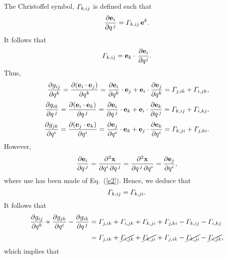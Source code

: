 \documentclass[12pt,prb,aps,notitlepage]{revtex4-1}
\begin{document}
The Christoffel symbol, ${\mit\Gamma}_{k,ij}$ is defined such that 
\begin{equation}\label{e25}
\frac{\partial {\bf e}_i}{\partial q^{\,j}} = {\mit\Gamma}_{k,ij}\,{\bf e}^k.
\end{equation}
It follows that 
\begin{equation}
{\mit\Gamma}_{k,ij} = {\bf e}_k\cdot\,\frac{\partial {\bf e}_i}{\partial q^j}.
\end{equation}
Thus, 
\begin{align}
\frac{\partial g_{ij}}{\partial q^k} = \frac{\partial ({\bf e}_i\cdot{\bf e}_j)}{\partial q^k}= \frac{\partial {\bf e}_i}{\partial q^k}\cdot{\bf e}_j + {\bf e}_i\cdot\frac{\partial {\bf e}_j}{\partial q^k}= {\mit\Gamma}_{j,ik} + {\mit\Gamma}_{i,jk},\\[0.5ex]
\frac{\partial g_{ik}}{\partial q^{\,j}} = \frac{\partial ({\bf e}_i\cdot{\bf e}_k)}{\partial q^{\,j}}= \frac{\partial {\bf e}_i}{\partial q^{\,j}}\cdot{\bf e}_k+ {\bf e}_i\cdot\frac{\partial {\bf e}_k}{\partial q^{\,j}}= {\mit\Gamma}_{k,ij} + {\mit\Gamma}_{i,kj},\\[0.5ex]
\frac{\partial g_{jk}}{\partial q^i} = \frac{\partial ({\bf e}_j\cdot{\bf e}_k)}{\partial q^i}= \frac{\partial {\bf e}_j}{\partial q^i}\cdot{\bf e}_k+ {\bf e}_j\cdot\frac{\partial {\bf e}_k}{\partial q^i}= {\mit\Gamma}_{k,ji} + {\mit\Gamma}_{j,ki}.
\end{align}
However,
\begin{equation}
\frac{\partial{\bf e}_i}{\partial q^{\,j}} = \frac{\partial^2{\bf x}}{\partial q^i\,\partial q^{\,j}}= \frac{\partial^2{\bf x}}{\partial q^{\,j}\,\partial q^{i}}
= \frac{\partial{\bf e}_j}{\partial q^i},
\end{equation}
where use has been made of Eq.~(\ref{e2}). Hence, we deduce that
\begin{equation}
{\mit\Gamma}_{k,ij}= {\mit\Gamma}_{k,ji}.
\end{equation}
It follows that
\begin{align}
\frac{\partial g_{ij}}{\partial q^k} + \frac{\partial g_{jk}}{\partial q^i} -\frac{\partial g_{ik}}{\partial q^{\,j}}& = {\mit\Gamma}_{j,ik} + {\mit\Gamma}_{i,jk}+ {\mit\Gamma}_{k,ji} + {\mit\Gamma}_{j,ki}-{\mit\Gamma}_{k,ij} - {\mit\Gamma}_{i,kj}\nonumber\\[0.5ex]
&= {\mit\Gamma}_{j,ik} + \cancel{{\mit\Gamma}_{i,jk}}+ \cancel{{\mit\Gamma}_{k,ji}} + {\mit\Gamma}_{j,ik}-\cancel{{\mit\Gamma}_{k,ji}} - \cancel{{\mit\Gamma}_{i,jk}},
\end{align}
which implies that
\end{document}
